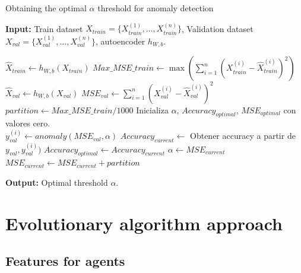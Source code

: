 \documentclass{iosart2c}
\begin{document}
\begin{algorithm}[h!]
\caption{Obtaining the optimal $\alpha$ threshold for anomaly detection}\label{obtener_umbral}
\textbf{Input:} Train dataset $X_{train}=\{X_{train}^{(1)},\ldots,X_{train}^{(n)}\}$, Validation dataset $X_{val}=\{X_{val}^{(1)},\ldots,X_{val}^{(n)}\}$, autoencoder $h_{W,b}$.\\

\begin{algorithmic}
\State $\hat{X}_{train} \xleftarrow{} h_{W,b}(X_{train})$ 
\State $Max\_MSE\_{train}\xleftarrow{}\max\left(\sum_{i=1}^n\left(X_{train}^{(i)}-\hat{X}_{train}^{(i)}\right)^2\right)$ 
\State $\hat{X}_{val} \xleftarrow{} h_{W,b}(X_{val})$ 
\State $MSE_{val}\xleftarrow{}\sum_{i=1}^n\left(X_{val}^{(i)}-\hat{X}_{val}^{(i)}\right)^2$ 
\State $partition\xleftarrow{} Max\_MSE\_{train}/1000$
\State Inicializa $\alpha$, $Accuracy_{optimal}$, $MSE_{optimal}$ con valores cero.\\


    \State $y_{val}^{(i)}\xleftarrow{}anomaly(MSE_{val},\alpha)$
    \State $Accuracy_{current}\xleftarrow{}$ Obtener accuracy a partir de $y_{val},y_{val}^{(i)})$
            \State $Accuracy_{optimal}\xleftarrow{}Accuracy_{current}$
            \State $\alpha\xleftarrow{}MSE_{current}$
        \EndIf
    \State $MSE_{current}\xleftarrow{}MSE_{current}+partition$
\EndFor\\
\end{algorithmic}
\textbf{Output:} Optimal threshold $\alpha$.\\
\end{algorithm}


\newpage



\section{Evolutionary algorithm approach}

\subsection{Features for agents}\label{variables}
\end{document}
